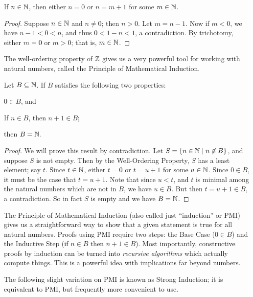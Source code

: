 \begin{prop}
If \(n \in \mathbb{N}\), then either \(n = 0\) or \(n = m+1\) for some \(m \in \mathbb{N}\).
\end{prop}

\begin{proof}
Suppose \(n \in \mathbb{N}\) and \(n \neq 0\); then \(n > 0\). Let \(m = n-1\). Now if \(m < 0\), we have \(n-1 < 0 < n\), and thus \(0 < 1-n < 1\), a contradiction. By trichotomy, either \(m = 0\) or \(m > 0\); that is, \(m \in \mathbb{N}\).
\end{proof}

The well-ordering property of $\mathbb{Z}$ gives us a very powerful tool for working with natural numbers, called the Principle of Mathematical Induction.

\begin{prop}
Let \(B \subseteq \mathbb{N}\). If \(B\) satisfies the following two properties:
\begin{proplist}
\item \(0 \in B\), and
\item If \(n \in B\), then \(n+1 \in B\);
\end{proplist}
then \(B = \mathbb{N}\).
\end{prop}

\begin{proof}
We will prove this result by contradiction. Let \(S = \{ n \in \mathbb{N} \mid n \not\in B \}\), and suppose \(S\) is not empty. Then by the Well-Ordering Property, \(S\) has a least element; say \(t\). Since \(t \in \mathbb{N}\), either \(t = 0\) or \(t = u+1\) for some \(u \in \mathbb{N}\). Since \(0 \in B\), it must be the case that \(t = u+1\). Note that since \(u < t\), and \(t\) is minimal among the natural numbers which are not in \(B\), we have \(u \in B\). But then \(t = u+1 \in B\), a contradiction. So in fact \(S\) is empty and we have \(B = \mathbb{N}\).
\end{proof}

The Principle of Mathematical Induction (also called just ``induction'' or PMI) gives us a straightforward way to show that a given statement is true for all natural numbers. Proofs using PMI require two steps: the Base Case (\(0 \in B\)) and the Inductive Step (if \(n \in B\) then \(n+1 \in B\)). Most importantly, constructive proofs by induction can be turned into \emph{recursive algorithms} which actually compute things. This is a powerful idea with implications far beyond numbers.

The following slight variation on PMI is known as Strong Induction; it is equivalent to PMI, but frequently more convenient to use.

